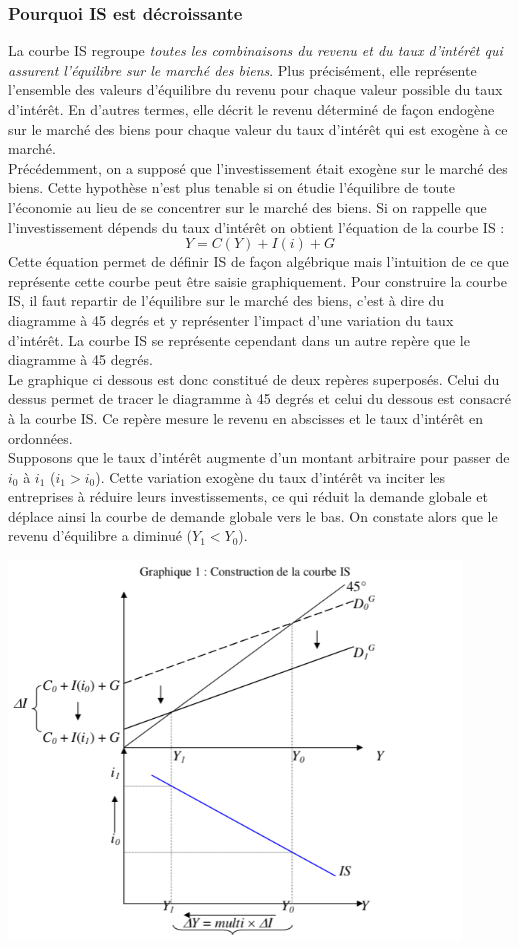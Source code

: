 \documentclass[10pt]{book}
\begin{document}
\subsubsection{Pourquoi IS est décroissante}
La courbe IS regroupe \textit{toutes les combinaisons du revenu et du taux d'intérêt qui assurent l'équilibre sur le marché des biens}. Plus précisément, elle représente l'ensemble des valeurs d'équilibre du revenu pour chaque valeur possible du taux d'intérêt. En d'autres termes, elle décrit le revenu déterminé de façon endogène sur le marché des biens pour chaque valeur du taux d'intérêt qui est exogène à ce marché. \\
Précédemment, on a supposé que l'investissement était exogène sur le marché des biens. Cette hypothèse n'est plus tenable si on étudie l'équilibre de toute l'économie au lieu de se concentrer sur le marché des biens. Si on rappelle que l'investissement dépends du taux d'intérêt on obtient l'équation de la courbe IS :
$$ Y = C(Y) + I(i) + G$$
Cette équation permet de définir IS de façon algébrique mais l'intuition de ce que représente cette courbe peut être saisie graphiquement. Pour construire la courbe IS, il faut repartir de l'équilibre sur le marché des biens, c'est à dire du diagramme à 45 degrés et y représenter l'impact d'une variation du taux d'intérêt. La courbe IS se représente cependant dans un autre repère que le diagramme à 45 degrés. \\
Le graphique ci dessous est donc constitué de deux repères superposés. Celui du dessus permet de tracer le diagramme à 45 degrés et celui du dessous est consacré à la courbe IS. Ce repère mesure le revenu en abscisses et le taux d'intérêt en ordonnées. \\
Supposons que le taux d'intérêt augmente d'un montant arbitraire pour passer de $i_0$ à $i_1$ ($i_1 > i_0$). Cette variation exogène du taux d'intérêt va inciter les entreprises à réduire leurs investissements, ce qui réduit la demande globale et déplace ainsi la courbe de demande globale vers le bas. On constate alors que le revenu d'équilibre a diminué ($Y_1 < Y_0$).
\begin{center}
  \includegraphics[width=12cm]{graph21.png}
\end{center}
\end{document}
